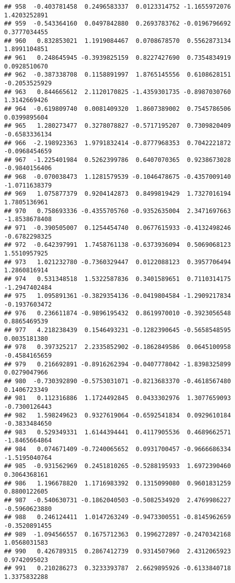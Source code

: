 \documentclass[
]{article}
\begin{document}
\begin{verbatim}
## 958  -0.403781458  0.2496583337  0.0123314752 -1.1655972076  1.4203252891
## 959  -0.543364160  0.0497842880  0.2693783762 -0.0196796692  0.3777034455
## 960   0.832853021  1.1919084467  0.0708678570  0.5562873134  1.8991104851
## 961   0.248645945 -0.3939825159  0.8227427690  0.7354834919  0.0928510670
## 962  -0.387338708  0.1158891997  1.8765145556  0.6108628151 -0.2053525929
## 963   0.844665612  2.1120170825 -1.4359301735 -0.8987030760  1.3142669426
## 964  -0.619809740  0.0081409320  1.8607389002  0.7545786506  0.0399895604
## 965   1.280273477  0.3278078827 -0.5717195207  0.7309820409 -0.6583336134
## 966  -2.198923363  1.9791832414 -0.8777968353  0.7042221872 -0.0968454659
## 967  -1.225401984  0.5262399786  0.6407070365  0.9238673028 -0.9840156406
## 968  -0.070038473  1.1281579539 -0.1046478675 -0.4357009140 -1.0711638379
## 969   1.075877379  0.9204142873  0.8499819429  1.7327016194  1.7805136961
## 970   0.758693336 -0.4355705760 -0.9352635004  2.3471697663 -1.8538678408
## 971  -0.390505007  0.1254454740  0.0677615933 -0.4132498246 -0.6782298325
## 972  -0.642397991  1.7458761138 -0.6373936094  0.5069068123  1.5510957925
## 973   1.021232780 -0.7360329447  0.0122088123  0.3957706494  1.2860816914
## 974   0.531348518  1.5322587836  0.3401589651  0.7110314175 -1.2947402484
## 975   1.095891361 -0.3829354136 -0.0419804584 -1.2909217834 -0.1937603472
## 976   0.236611874 -0.9896195432  0.8619970010 -0.3923056548  0.8865469539
## 977   4.218238439  0.1546493231 -0.1282390645 -0.5658548595  0.0035181380
## 978   0.397325217  2.2335852902 -0.1862849586  0.0645100958 -0.4584165659
## 979   0.216692891 -0.8916262394 -0.0407778042 -1.8398325899  0.0279047966
## 980  -0.730392890 -0.5753031071 -0.8213683370 -0.4618567480  0.1406723349
## 981   0.112316886  1.1724492845  0.0433302976  1.3077659093 -0.7300126443
## 982   1.598249623  0.9327619064 -0.6592541834  0.0929610184 -0.3833484650
## 983   0.529349331  1.6144394441  0.4117905536  0.4689662571 -1.8465664864
## 984   0.074671409 -0.7240065652  0.0931700457 -0.9666686334 -1.5195040764
## 985  -0.931562969  0.2451810265 -0.5288195933  1.6972390460  0.3064368161
## 986   1.196678820  1.1716983392  0.1315099080  0.9601831259  0.8800122605
## 987  -0.540630731 -0.1862040503 -0.5082534920  2.4769986227 -0.5960623880
## 988   0.246124411  1.0147263249 -0.9473300551 -0.8145962659 -0.3520891455
## 989  -1.094566557  0.1675712363  0.1996272897 -0.2470342168  1.0568031583
## 990   0.426789315  0.2867412739  0.9314507960  2.4312065923  0.9742095023
## 991   0.210286273  0.3233393787  2.6629895926 -0.6133840718  1.3375832288

\end{verbatim}
\end{document}
